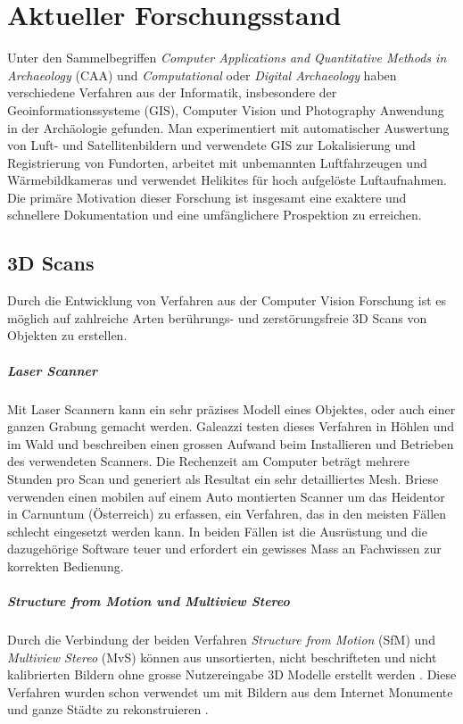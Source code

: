 \chapter{Aktueller Forschungsstand} \label{related:work}

	Unter den Sammelbegriffen \emph{Computer Applications and Quantitative Methods in Archaeology} (CAA) und \emph{Computational} oder \emph{Digital Archaeology} haben verschiedene Verfahren aus der Informatik, insbesondere der Geoinformationssysteme (GIS), Computer Vision und Photography Anwendung in der Archäologie gefunden.
	Man experimentiert mit automatischer Auswertung von Luft- und Satellitenbildern und verwendete GIS zur Lokalisierung und Registrierung von Fundorten, arbeitet mit unbemannten Luftfahrzeugen und Wärmebildkameras und verwendet Helikites für hoch aufgelöste Luftaufnahmen.
	Die primäre Motivation dieser Forschung ist insgesamt eine exaktere und schnellere Dokumentation und eine umfänglichere Prospektion zu erreichen.

	\section{3D Scans}
		Durch die Entwicklung von Verfahren aus der Computer Vision Forschung ist es möglich auf zahlreiche Arten berührungs- und zerstörungsfreie 3D Scans von Objekten zu erstellen.
		\paragraph{Laser Scanner}
			Mit Laser Scannern kann ein sehr präzises Modell eines Objektes, oder auch einer ganzen Grabung gemacht werden. Galeazzi  \etal{} testen dieses Verfahren in Höhlen und im Wald und beschreiben einen grossen Aufwand beim Installieren und Betrieben des verwendeten Scanners. Die Rechenzeit am Computer beträgt mehrere Stunden pro Scan und generiert als Resultat ein sehr detailliertes Mesh.
			Briese \etal{} verwenden einen mobilen auf einem Auto montierten Scanner um das Heidentor in Carnuntum (Österreich) zu erfassen, ein Verfahren, das in den meisten Fällen schlecht eingesetzt werden kann.
			In beiden Fällen ist die Ausrüstung und die dazugehörige Software teuer und erfordert ein gewisses Mass an Fachwissen zur korrekten Bedienung.

		\paragraph{Structure from Motion und Multiview Stereo}
			Durch die Verbindung der beiden Verfahren \emph{Structure from Motion} (SfM) und \emph{Multiview Stereo} (MvS) können aus unsortierten, nicht beschrifteten und nicht kalibrierten Bildern ohne grosse Nutzereingabe 3D Modelle erstellt werden . Diese Verfahren wurden schon verwendet um mit Bildern aus dem Internet Monumente und ganze Städte zu rekonstruieren .
		
